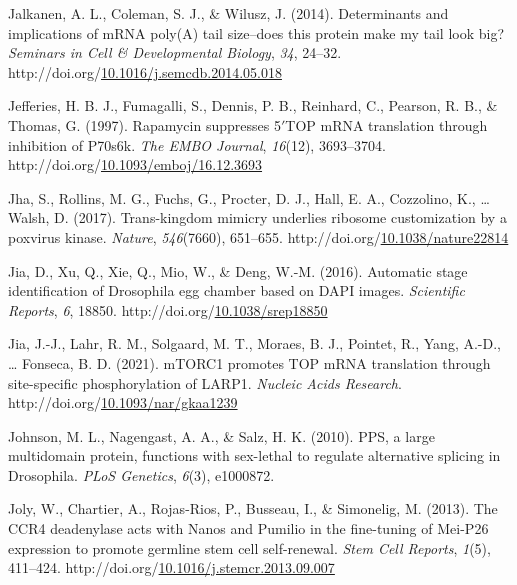 \documentclass[12pt,oneside]{reedthesis}
\newlength{\cslhangindent}
\newenvironment{CSLReferences}[2] %
 {%
  \setlength{\parindent}{0pt}
  \ifodd #1 \everypar{\setlength{\hangindent}{\cslhangindent}}\ignorespaces\fi
  \ifnum #2 > 0
  \setlength{\parskip}{#2\baselineskip}
  \fi
 }%
 {}
\begin{document}
\begin{CSLReferences}{1}{0}
\leavevmode{}%
Jalkanen, A. L., Coleman, S. J., \& Wilusz, J. (2014). Determinants and implications of {mRNA} poly({A}) tail size--does this protein make my tail look big? \emph{Seminars in Cell \& Developmental Biology}, \emph{34}, 24--32. http://doi.org/\href{https://doi.org/10.1016/j.semcdb.2014.05.018}{10.1016/j.semcdb.2014.05.018}

\leavevmode{}%
Jefferies, H. B. J., Fumagalli, S., Dennis, P. B., Reinhard, C., Pearson, R. B., \& Thomas, G. (1997). Rapamycin suppresses 5{\({'}\)}{TOP mRNA} translation through inhibition of P70s6k. \emph{The EMBO Journal}, \emph{16}(12), 3693--3704. http://doi.org/\href{https://doi.org/10.1093/emboj/16.12.3693}{10.1093/emboj/16.12.3693}

\leavevmode{}%
Jha, S., Rollins, M. G., Fuchs, G., Procter, D. J., Hall, E. A., Cozzolino, K., \ldots{} Walsh, D. (2017). Trans-kingdom mimicry underlies ribosome customization by a poxvirus kinase. \emph{Nature}, \emph{546}(7660), 651--655. http://doi.org/\href{https://doi.org/10.1038/nature22814}{10.1038/nature22814}

\leavevmode{}%
Jia, D., Xu, Q., Xie, Q., Mio, W., \& Deng, W.-M. (2016). Automatic stage identification of {Drosophila} egg chamber based on {DAPI} images. \emph{Scientific Reports}, \emph{6}, 18850. http://doi.org/\href{https://doi.org/10.1038/srep18850}{10.1038/srep18850}

\leavevmode{}%
Jia, J.-J., Lahr, R. M., Solgaard, M. T., Moraes, B. J., Pointet, R., Yang, A.-D., \ldots{} Fonseca, B. D. (2021). {mTORC1} promotes {TOP mRNA} translation through site-specific phosphorylation of {LARP1}. \emph{Nucleic Acids Research}. http://doi.org/\href{https://doi.org/10.1093/nar/gkaa1239}{10.1093/nar/gkaa1239}

\leavevmode{}%
Johnson, M. L., Nagengast, A. A., \& Salz, H. K. (2010). {PPS}, a large multidomain protein, functions with sex-lethal to regulate alternative splicing in {Drosophila}. \emph{PLoS Genetics}, \emph{6}(3), e1000872.

\leavevmode{}%
Joly, W., Chartier, A., Rojas-Rios, P., Busseau, I., \& Simonelig, M. (2013). The {CCR4} deadenylase acts with {Nanos} and {Pumilio} in the fine-tuning of {Mei-P26} expression to promote germline stem cell self-renewal. \emph{Stem Cell Reports}, \emph{1}(5), 411--424. http://doi.org/\href{https://doi.org/10.1016/j.stemcr.2013.09.007}{10.1016/j.stemcr.2013.09.007}


\end{CSLReferences}
\end{document}
